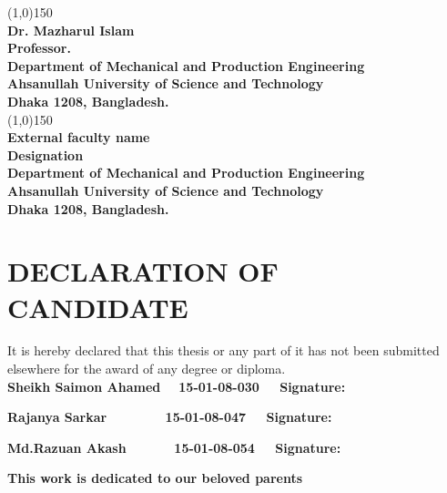 \documentclass[11pt,a4paper,oneside]{memoir}
\begin{document}
\vspace{1.5cm}
\line(1,0){150}\\
\textbf{Dr. Mazharul Islam}\\
\textbf{Professor.}\\
\textbf{Department of Mechanical and Production Engineering}\\
\textbf{Ahsanullah University of Science and Technology}\\
\textbf{Dhaka 1208, Bangladesh.}\\

\vspace{1.5cm}
\line(1,0){150}\\
\textbf{External faculty name}\\
\textbf{Designation}\\
\textbf{Department of Mechanical and Production Engineering}\\
\textbf{Ahsanullah University of Science and Technology}\\
\textbf{Dhaka 1208, Bangladesh.}\\

\chapter*{DECLARATION OF CANDIDATE}

It is hereby declared that this thesis or any part of it has not been submitted elsewhere for the award of any degree or diploma.
\vspace{2.5cm}\\

\textbf{Sheikh Saimon Ahamed \,\,\,\, 15-01-08-030 \,\,\,\,\, Signature:}\\

\vspace{0.5cm}

\textbf{Rajanya Sarkar \,\,\,\,\,\,\,\,\,\,\,\,\,\,\,\,\,\,\,\,\,\,\, 15-01-08-047 \,\,\,\,\, Signature:}\\

\vspace{0.5cm}

\textbf{Md.Razuan Akash \,\,\,\,\,\,\,\,\,\,\,\,\,\,\,\,\,\, 15-01-08-054 \,\,\,\,\, Signature:}\\

\newpage
\begin{center}
    
\textbf{This work is dedicated to our beloved parents}
\end{center}
\end{document}
